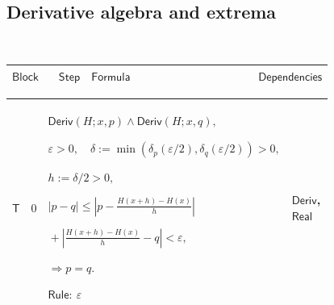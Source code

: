 \documentclass[12pt,reqno]{amsart}
\theoremstyle{blueplain}
\numberwithin{equation}{section}
\newlength{\FTCOneColumnBody}
\begin{document}
{\scriptsize \ }

\subsection{\protect\scriptsize Derivative algebra and extrema}

{\scriptsize {\ }}

{\scriptsize \setlength{\parskip}{0pt}\nointerlineskip
\noindent 
\begin{tabular}{|@{}>{\centering\arraybackslash}m{\FTCOneColumnBody}|}
\hline
$\displaystyle \mathsf{DerivativeAlgebraAndExtrema}$ \\ \hline
\end{tabular}%
}

{\scriptsize \setlength{\parskip}{0pt}\nointerlineskip
\noindent 
\begin{tabular}{|@{}>{\centering\arraybackslash}m{0.10658\linewidth}|>{\centering\arraybackslash}m{0.03553\linewidth}|>{\centering\arraybackslash}m{0.52105\linewidth}|>{\centering\arraybackslash}m{0.23684\linewidth}|}
\hline
$\displaystyle \mathsf{Block}$ & $\displaystyle \mathsf{Step}$ & $%
\displaystyle \mathsf{Formula}$ & $\displaystyle \mathsf{Dependencies}$ \\ 
\hline
\end{tabular}%
}

{\scriptsize \setlength{\parskip}{0pt}\nointerlineskip
\noindent 
\begin{tabular}{|@{}>{\centering\arraybackslash}m{\FTCOneColumnBody}|}
\hline
$\displaystyle \mathsf{Context\_T}:=$\par$\displaystyle u,v,H:\mathsf{RF}%
,\quad x,p,q,c,d:\mathsf{Real}.$ \\ \hline
\end{tabular}%
}

{\scriptsize \setlength{\parskip}{0pt}\nointerlineskip
\noindent 
\begin{tabular}{|@{}>{\centering\arraybackslash}m{0.10658\linewidth}|>{\centering\arraybackslash}m{0.03553\linewidth}|>{\centering\arraybackslash}m{0.52105\linewidth}|>{\centering\arraybackslash}m{0.23684\linewidth}|}
\hline
\hypertarget{proof:T0}{$\displaystyle \mathsf{T}$} & $\displaystyle 0$ & $%
\displaystyle \mathsf{Deriv}(H;x,p)\land\mathsf{Deriv}(H;x,q),$\par$%
\displaystyle \varepsilon>0,\quad\delta:=\min(\delta_p(\varepsilon/2),%
\delta_q(\varepsilon/2))>0,$\par$\displaystyle h:=\delta/2>0,$\par$%
\displaystyle |p-q|\le\left|p-\frac{H(x+h)-H(x)}h\right|$\par$\displaystyle %
{}+\left|\frac{H(x+h)-H(x)}h-q\right|<\varepsilon,$\par$\displaystyle %
\Rightarrow p=q.$\par$\displaystyle \mathsf{Rule}:\ \varepsilon$ & 
\hyperlink{def:Deriv}{$\displaystyle \mathsf{Deriv}$}, \hyperlink{ax:Real}{$%
\displaystyle \mathsf{Real}$} \\ \hline
\end{tabular}%
}
\end{document}

